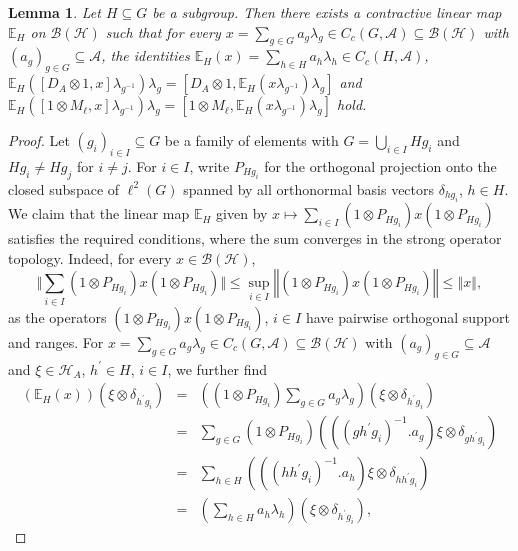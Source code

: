 \documentclass[10pt,a4paper]{amsart}
\newtheorem{lemma}{Lemma}
\begin{document}
\begin{lemma} \label{ConditionalExpectation-1} Let $H\subseteq G$
be a subgroup. Then there exists a contractive linear map $\mathbb{E}_{H}$
on $\mathcal{B}(\mathcal{H})$ such that for every $x=\sum_{g\in G}a_{g}\lambda_{g}\in C_{c}(G,\mathcal{A})\subseteq\mathcal{B}(\mathcal{H})$
with $(a_{g})_{g\in G}\subseteq\mathcal{A}$, the identities
$\mathbb{E}_{H}(x)=\sum_{h\in H}a_{h}\lambda_{h} \in C_c(H,\mathcal{A})$, $\mathbb{E}_{H}([D_{A}\otimes1,x]\lambda_{g^{-1}})\lambda_{g}=[D_{A}\otimes1,\mathbb{E}_{H}(x\lambda_{g^{-1}})\lambda_{g}]$
and $\mathbb{E}_{H}([1\otimes M_{\ell},x]\lambda_{g^{-1}})\lambda_{g}=[1\otimes M_{\ell},\mathbb{E}_{H}(x\lambda_{g^{-1}})\lambda_{g}]$
hold. \end{lemma}

\begin{proof} Let $(g_{i})_{i\in I}\subseteq G$ be a family of elements
with $G=\bigcup_{i\in I}Hg_{i}$ and $Hg_{i}\neq Hg_{j}$ for $i\neq j$.
For $i\in I$, write $P_{Hg_{i}}$ for the orthogonal projection onto
the closed subspace of $\ell^{2}(G)$ spanned by all orthonormal basis
vectors $\delta_{hg_{i}}$, $h\in H$. We claim that the linear map
$\mathbb{E}_{H}$ given by $x\mapsto\sum_{i\in I}(1\otimes P_{Hg_{i}})x(1\otimes P_{Hg_{i}})$
satisfies the required conditions, where the sum converges in the strong
operator topology. Indeed, for every $x\in\mathcal{B}(\mathcal{H})$,
\[
\Vert\sum_{i\in I}(1\otimes P_{Hg_{i}})x(1\otimes P_{Hg_{i}})\Vert\leq\sup_{i\in I}\left\Vert (1\otimes P_{Hg_{i}})x(1\otimes P_{Hg_{i}})\right\Vert \leq\left\Vert x\right\Vert ,
\]
as the operators $(1\otimes P_{Hg_{i}})x(1\otimes P_{Hg_{i}})$, $i\in I$
have pairwise orthogonal support and ranges. For $x=\sum_{g\in G}a_{g}\lambda_{g}\in C_{c}(G,\mathcal{A})\subseteq\mathcal{B}(\mathcal{H})$
with $(a_{g})_{g\in G}\subseteq\mathcal{A}$ and $\xi\in\mathcal{H}_{A}$,
$h^{\prime}\in H$, $i\in I$, we further find 
\begin{eqnarray}
\nonumber
\left(\mathbb{E}_{H}(x)\right)(\xi\otimes\delta_{h^{\prime}g_{i}}) &=& ((1\otimes P_{Hg_{i}})\sum_{g\in G}a_{g}\lambda_{g})(\xi\otimes\delta_{h^{\prime}g_{i}}) \\
\nonumber
&=& \sum_{g\in G}(1\otimes P_{Hg_{i}})\left(((gh^{\prime}g_{i})^{-1}.a_{g})\xi\otimes\delta_{gh^{\prime}g_{i}}\right) \\
\nonumber
&=& \sum_{h\in H}\left(((hh^{\prime}g_{i})^{-1}.a_{h})\xi\otimes\delta_{hh^{\prime}g_{i}}\right) \\
\nonumber
&=& (\sum_{h\in H}a_{h}\lambda_{h})(\xi\otimes\delta_{h^{\prime}g_{i}}),

\end{eqnarray}
\end{proof}
\end{document}
